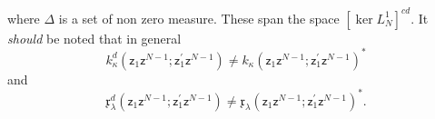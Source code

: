 \documentclass[aps,preprint]{revtex4}%
\begin{document}
\begin{enumerate}
where $\Delta$ is a set of non zero measure. These span the space $\left[
\ker L_{N}^{1}\right]  ^{cd}$. It \emph{should} be noted that in general%
\begin{equation}
k_{\kappa}^{d}\left(  \mathsf{z}_{1}\mathsf{z}^{N-1};\mathsf{z}_{1}^{\prime
}\mathsf{z}^{N-1}\right)  \neq k_{\kappa}\left(  \mathsf{z}_{1}\mathsf{z}%
^{N-1};\mathsf{z}_{1}^{\prime}\mathsf{z}^{N-1}\right)  ^{\ast}%
\end{equation}
and
\begin{equation}
\mathfrak{x}_{\lambda}^{d}\left(  \mathsf{z}_{1}\mathsf{z}^{N-1}%
;\mathsf{z}_{1}^{\prime}\mathsf{z}^{N-1}\right)  \neq\mathfrak{x}_{\lambda
}\left(  \mathsf{z}_{1}\mathsf{z}^{N-1};\mathsf{z}_{1}^{\prime}\mathsf{z}%
^{N-1}\right)  ^{\ast}.
\end{equation}

\end{enumerate}
\end{document}
